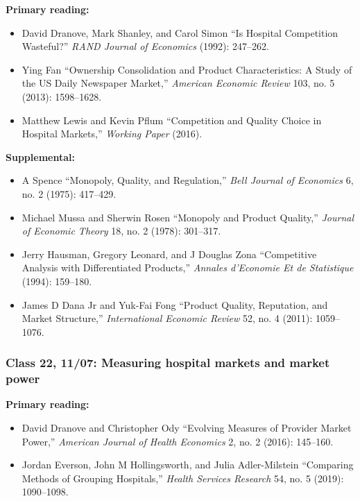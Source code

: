\documentclass[11pt,]{article}
\providecommand{\tightlist}{%
  \setlength{\itemsep}{0pt}\setlength{\parskip}{0pt}}
\begin{document}
\textbf{Primary reading:}

\begin{itemize}
\tightlist
\item
  David Dranove, Mark Shanley, and Carol Simon {``Is Hospital
  Competition Wasteful?''} \emph{RAND Journal of Economics} (1992):
  247--262.
\item
  Ying Fan {``Ownership Consolidation and Product Characteristics: {A}
  Study of the {US} Daily Newspaper Market,''} \emph{American Economic
  Review} 103, no. 5 (2013): 1598--1628.
\item
  Matthew Lewis and Kevin Pflum {``Competition and {Quality} {Choice} in
  {Hospital} {Markets},''} \emph{Working Paper} (2016).
\end{itemize}

\textbf{Supplemental:}

\begin{itemize}
\tightlist
\item
  A Spence {``Monopoly, {Quality}, and {Regulation},''} \emph{Bell
  Journal of Economics} 6, no. 2 (1975): 417--429.
\item
  Michael Mussa and Sherwin Rosen {``Monopoly and Product Quality,''}
  \emph{Journal of Economic Theory} 18, no. 2 (1978): 301--317.
\item
  Jerry Hausman, Gregory Leonard, and J Douglas Zona {``Competitive
  Analysis with Differentiated Products,''} \emph{Annales d'Economie Et
  de Statistique} (1994): 159--180.
\item
  James D Dana Jr and Yuk-Fai Fong {``Product Quality, Reputation, and
  Market Structure,''} \emph{International Economic Review} 52, no. 4
  (2011): 1059--1076.
\end{itemize}

\hypertarget{class-22-1107-measuring-hospital-markets-and-market-power}{%
\subsubsection{Class 22, 11/07: Measuring hospital markets and market
power}\label{class-22-1107-measuring-hospital-markets-and-market-power}}

\textbf{Primary reading:}

\begin{itemize}
\tightlist
\item
  David Dranove and Christopher Ody {``Evolving {Measures} of {Provider}
  {Market} {Power},''} \emph{American Journal of Health Economics} 2,
  no. 2 (2016): 145--160.
\item
  Jordan Everson, John M Hollingsworth, and Julia Adler-Milstein
  {``Comparing Methods of Grouping Hospitals,''} \emph{Health Services
  Research} 54, no. 5 (2019): 1090--1098.
\end{itemize}
\end{document}
